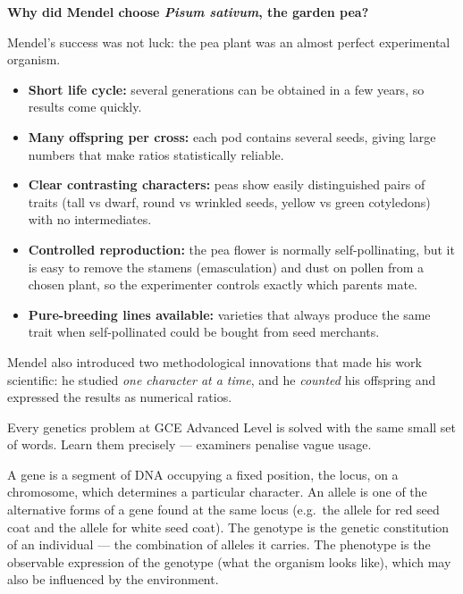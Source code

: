 \documentclass[11pt]{article}
\newcommand{\cle}[1]{{\popxbold\color{popdark}#1}}
\newcounter{popsec}
\newcounter{popsub}
\newcommand{\courssub}[1]{%
  \stepcounter{popsub}%
  \par\vspace{9pt}\noindent{\popxbold\fontsize{11.5}{13}\selectfont\color{popink}{\color{poporange}\thepopsec.\thepopsub}\hspace{6pt}#1}\par\nopagebreak\vspace{4pt}
}
\begin{document}
\textbf{Why did Mendel choose \emph{Pisum sativum}, the garden pea?}\par
Mendel's success was not luck: the pea plant was an almost perfect experimental organism.

\begin{itemize}
\item \textbf{Short life cycle:} several generations can be obtained in a few years, so results come quickly.
\item \textbf{Many offspring per cross:} each pod contains several seeds, giving large numbers that make ratios statistically reliable.
\item \textbf{Clear contrasting characters:} peas show easily distinguished pairs of traits (tall vs dwarf, round vs wrinkled seeds, yellow vs green cotyledons) with no intermediates.
\item \textbf{Controlled reproduction:} the pea flower is normally self-pollinating, but it is easy to remove the stamens (emasculation) and dust on pollen from a chosen plant, so the experimenter controls exactly which parents mate.
\item \textbf{Pure-breeding lines available:} varieties that always produce the same trait when self-pollinated could be bought from seed merchants.
\end{itemize}

Mendel also introduced two methodological innovations that made his work scientific: he studied \emph{one character at a time}, and he \emph{counted} his offspring and expressed the results as numerical ratios.

\courssub{Essential Genetic Vocabulary}

Every genetics problem at GCE Advanced Level is solved with the same small set of words. Learn them precisely --- examiners penalise vague usage.

\begin{definition}
A \cle{gene} is a segment of DNA occupying a fixed position, the \cle{locus}, on a chromosome, which determines a particular character. An \cle{allele} is one of the alternative forms of a gene found at the same locus (e.g.\ the allele for red seed coat and the allele for white seed coat). The \cle{genotype} is the genetic constitution of an individual --- the combination of alleles it carries. The \cle{phenotype} is the observable expression of the genotype (what the organism looks like), which may also be influenced by the environment.
\end{definition}
\end{document}
